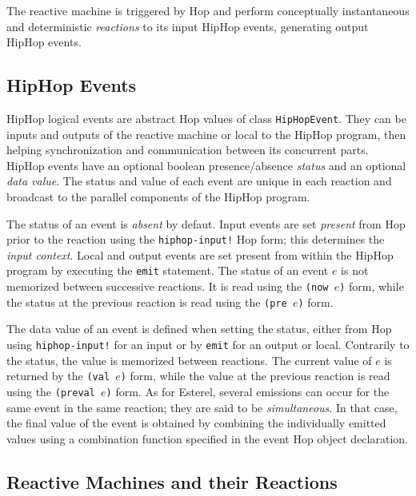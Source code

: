 \documentclass{llncs}
\begin{document}
The reactive machine is triggered by Hop and perform conceptually
instantaneous and deterministic {\em reactions} to its input HipHop events, generating output HipHop events.

\subsection{HipHop Events}
\label{HipHop events}

HipHop logical events are abstract Hop values of class {\texttt{HipHopEvent}}.
They can be inputs and outputs of the reactive
machine or local to the HipHop program, then helping
synchronization and communication between its concurrent parts.
HipHop events have an optional boolean presence/absence {\em{status}}
and an optional {\em data value}. The
status and value of each event are unique in each reaction and
broadcast to the parallel components of the HipHop program.

The status of an event is {\em{absent}} by defaut. Input events are
set {\em{present}} from Hop prior to the reaction using the
{\texttt{hiphop-input!}} Hop form; this determines the {\em{input
context}}. Local and output events are set present from within the
HipHop program by executing the {\texttt{emit{}}} statement.
The status of an event $e$ is not memorized between successive reactions. It is read using the {\texttt{(now{} $e$)}} form, while
the status at the previous reaction is read using the {\texttt{(pre{} $e$)}}
form.

The data value of an event is defined when setting the status, either
from Hop using {\texttt{hiphop-input!}} for an input or by
{\texttt{emit{}}} for an output or local. Contrarily to the
status, the value is memorized between reactions. The current value of
$e$ is returned by the {\texttt{(val{} $e$)}} form, while the
value at the previous reaction is read using the
{\texttt{(preval{} $e$)}} form. As for Esterel, several
emissions can occur for the same event in the same reaction; they are
said to be {\em{simultaneous}}.  In that case, the final value of the
event is obtained by combining the individually emitted values using a
combination function specified in the event Hop object declaration.

\subsection{Reactive Machines and their Reactions}
\label{Reactive Machines and their Reactions}
\end{document}
